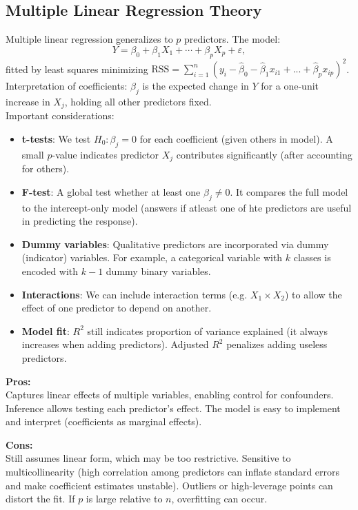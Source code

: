 \documentclass[11pt]{article}
\begin{document}
\subsection{Multiple Linear Regression Theory}
Multiple linear regression generalizes to $p$ predictors. The model:
\[ Y = \beta_0 + \beta_1 X_1 + \cdots + \beta_p X_p + \varepsilon, \]
fitted by least squares minimizing $\text{RSS} = \sum_{i=1}^n (y_i - \hat\beta_0 - \hat{\beta}_1x_{i1} + ... + \hat\beta_px_{ip})^2$. Interpretation of coefficients: $\beta_j$ is the expected change in $Y$ for a one-unit increase in $X_j$, holding all other predictors fixed. \\

\noindent Important considerations:
\begin{itemize}
  \item \textbf{t-tests}: We test $H_0:\beta_j=0$ for each coefficient (given others in model). A small $p$-value indicates predictor $X_j$ contributes significantly (after accounting for others).
  \item \textbf{F-test}: A global test whether at least one $\beta_j \neq 0$. It compares the full model to the intercept-only model (answers if atleast one of hte predictors are useful in predicting the response).
  \item \textbf{Dummy variables}: Qualitative predictors are incorporated via dummy (indicator) variables. For example, a categorical variable with $k$ classes is encoded with $k-1$ dummy binary variables.
  \item \textbf{Interactions}: We can include interaction terms (e.g. $X_1 \times X_2$) to allow the effect of one predictor to depend on another.
  \item \textbf{Model fit}: $R^2$ still indicates proportion of variance explained (it always increases when adding predictors). Adjusted $R^2$ penalizes adding useless predictors.
\end{itemize}

\noindent \textbf{Pros:} \\
\noindent Captures linear effects of multiple variables, enabling control for confounders. Inference allows testing each predictor’s effect. The model is easy to implement and interpret (coefficients as marginal effects).

\noindent \textbf{Cons:} \\
\noindent Still assumes linear form, which may be too restrictive. Sensitive to multicollinearity (high correlation among predictors can inflate standard errors and make coefficient estimates unstable). Outliers or high-leverage points can distort the fit. If $p$ is large relative to $n$, overfitting can occur.
\end{document}
